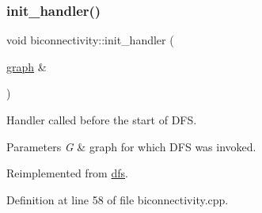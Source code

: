 \subsubsection{\texorpdfstring{init\+\_\+handler()}{init\_handler()}}
{\footnotesize\ttfamily void biconnectivity\+::init\+\_\+handler (\begin{DoxyParamCaption}\item[{\mbox{\hyperlink{classgraph}{graph}} \&}]{ }\end{DoxyParamCaption})\hspace{0.3cm}{\ttfamily [virtual]}}



Handler called before the start of D\+FS. 


\begin{DoxyParams}{Parameters}
{\em G} & graph for which D\+FS was invoked. \\
\hline
\end{DoxyParams}


Reimplemented from \mbox{\hyperlink{classdfs_aae46a50d0c73c63bf72e483668fd22a2}{dfs}}.



Definition at line 58 of file biconnectivity.\+cpp.



